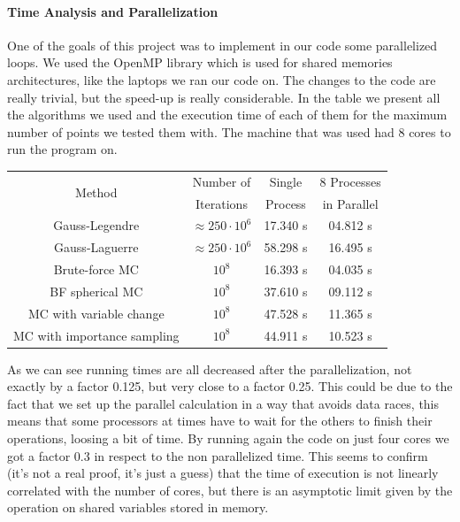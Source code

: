 \documentclass[10pt,a4paper,titlepage]{article}
\begin{document}
\paragraph{Time Analysis and Parallelization} One of the goals of this project was to implement in our code some parallelized loops. We used the OpenMP library which is used for shared memories architectures, like the laptops we ran our code on. The changes to the code are really trivial, but the speed-up is really considerable. In the table we present all the algorithms we used and the execution time of each of them for the maximum number of points we tested them with. The machine that was used had 8 cores to run the program on.\\
\begin{center}
\begin{tabular}{|c|c|c|c|}
\hline
\multirow{2}{*}{Method} & Number of       			& Single    & 8 Processes  \\
                        &Iterations       			& Process   & in Parallel  \\\hline
Gauss-Legendre          &$\approx 250 \cdot 10^6$	& 17.340 s  & 04.812 s     \\\hline
Gauss-Laguerre          &$\approx 250 \cdot 10^6$	& 58.298 s  & 16.495 s     \\\hline
Brute-force MC          &  $10^8$   	  			& 16.393 s  & 04.035 s     \\\hline
BF spherical MC         &  $10^8$         			& 37.610 s  & 09.112 s     \\\hline
MC with variable change &  $10^8$         			& 47.528 s  & 11.365 s     \\\hline
MC with importance sampling & $10^8$      			& 44.911 s  & 10.523 s     \\\hline
\end{tabular}
\end{center}
As we can see running times are all decreased after the parallelization, not exactly by a factor 0.125, but very close to a factor 0.25. This could be due to the fact that we set up the parallel calculation in a way that avoids data races, this means that some processors at times have to wait for the others to finish their operations, loosing a bit of time. By running again the code on just four cores we got a factor 0.3 in respect to the non parallelized time. This seems to confirm (it's not a real proof, it's just a guess) that the time of execution is not linearly correlated with the number of cores, but there is an asymptotic limit given by the operation on shared variables stored in memory.\\
\end{document}
